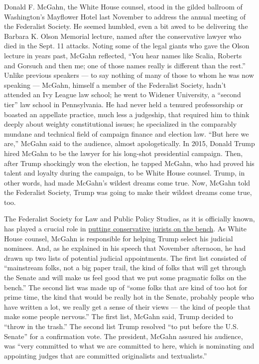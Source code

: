 Donald F. McGahn, the White House counsel, stood in the gilded ballroom
of Washington's Mayflower Hotel last November to address the annual
meeting of the Federalist Society. He seemed humbled, even a bit awed to
be delivering the Barbara K. Olson Memorial lecture, named after the
conservative lawyer who died in the Sept. 11 attacks. Noting some of the
legal giants who gave the Olson lecture in years past, McGahn reflected,
``You hear names like Scalia, Roberts and Gorsuch and then me; one of
those names really is different than the rest.'' Unlike previous
speakers --- to say nothing of many of those to whom he was now speaking
--- McGahn, himself a member of the Federalist Society, hadn't attended
an Ivy League law school; he went to Widener University, a ``second
tier'' law school in Pennsylvania. He had never held a tenured
professorship or boasted an appellate practice, much less a judgeship,
that required him to think deeply about weighty constitutional issues;
he specialized in the comparably mundane and technical field of campaign
finance and election law. ``But here we are,'' McGahn said to the
audience, almost apologetically. In 2015, Donald Trump hired McGahn to
be the lawyer for his long-shot presidential campaign. Then, after Trump
shockingly won the election, he tapped McGahn, who had proved his talent
and loyalty during the campaign, to be White House counsel. Trump, in
other words, had made McGahn's wildest dreams come true. Now, McGahn
told the Federalist Society, Trump was going to make their wildest
dreams come true, too.

The Federalist Society for Law and Public Policy Studies, as it is
officially known, has played a crucial role in
\href{https://www.nytimes3xbfgragh.onion/2020/06/29/us/politics/supreme-court-trump-biden.html}{putting
conservative jurists on the bench}. As White House counsel, McGahn is
responsible for helping Trump select his judicial nominees. And, as he
explained in his speech that November afternoon, he had drawn up two
lists of potential judicial appointments. The first list consisted of
``mainstream folks, not a big paper trail, the kind of folks that will
get through the Senate and will make us feel good that we put some
pragmatic folks on the bench.'' The second list was made up of ``some
folks that are kind of too hot for prime time, the kind that would be
really hot in the Senate, probably people who have written a lot, we
really get a sense of their views --- the kind of people that make some
people nervous.'' The first list, McGahn said, Trump decided to ``throw
in the trash.'' The second list Trump resolved ``to put before the U.S.
Senate'' for a confirmation vote. The president, McGahn assured his
audience, was ``very committed to what we are committed to here, which
is nominating and appointing judges that are committed originalists and
textualists.''

